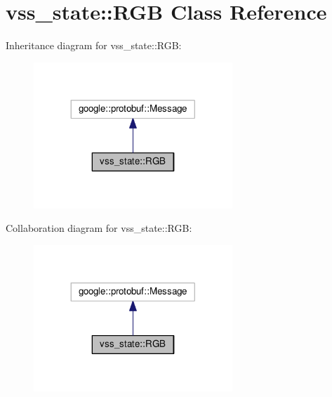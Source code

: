 \hypertarget{classvss__state_1_1RGB}{\section{vss\-\_\-state\-:\-:R\-G\-B Class Reference}
\label{classvss__state_1_1RGB}
}


Inheritance diagram for vss\-\_\-state\-:\-:R\-G\-B\-:
\nopagebreak
\begin{figure}[H]
\begin{center}
\leavevmode
\includegraphics[width=212pt]{classvss__state_1_1RGB__inherit__graph}
\end{center}
\end{figure}


Collaboration diagram for vss\-\_\-state\-:\-:R\-G\-B\-:
\nopagebreak
\begin{figure}[H]
\begin{center}
\leavevmode
\includegraphics[width=212pt]{classvss__state_1_1RGB__coll__graph}
\end{center}
\end{figure}
